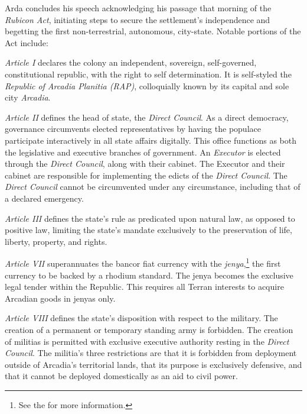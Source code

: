 Arda concludes his speech acknowledging his passage that morning of the {\it Rubicon Act}, initiating steps to secure the settlement's independence and begetting the first non-terrestrial, autonomous, city-state. Notable portions of the Act include:

\StartTimelineDocument
\startitemize[5]
\setupwhitespace[big]
\item {\it Article I} declares the colony an independent, sovereign, self-governed, constitutional republic, with the right to self determination. It is self-styled the {\it Republic of Arcadia Planitia (RAP)}, colloquially known by its capital and sole city {\it Arcadia}.

\item {\it Article II} defines the head of state, the {\it Direct Council}. As a direct democracy, governance circumvents elected representatives by having the populace participate interactively in all state affairs digitally. This office functions as both the legislative and executive branches of government. An {\it Executor} is elected through the {\it Direct Council}, along with their cabinet. The Executor and their cabinet are responsible for implementing the edicts of the {\it Direct Council}. The {\it Direct Council} cannot be circumvented under any circumstance, including that of a declared emergency.

\item {\it Article III} defines the state's rule as predicated upon natural law, as opposed to positive law, limiting the state's mandate exclusively to the preservation of life, liberty, property, and rights.

\item {\it Article VII} superannuates the bancor fiat currency with the {\it jenya},\footnote{See the \about[Jenya] for more information.} the first currency to be backed by a rhodium standard. The jenya becomes the exclusive legal tender within the Republic. This requires all Terran interests to acquire Arcadian goods in jenyas only.

\item {\it Article VIII} defines the state's disposition with respect to the military. The creation of a permanent or temporary standing army is forbidden. The creation of militias is permitted with exclusive executive authority resting in the {\it Direct Council}. The militia's three restrictions are that it is forbidden from deployment outside of Arcadia's territorial lands, that its purpose is exclusively defensive, and that it cannot be deployed domestically as an aid to civil power.

